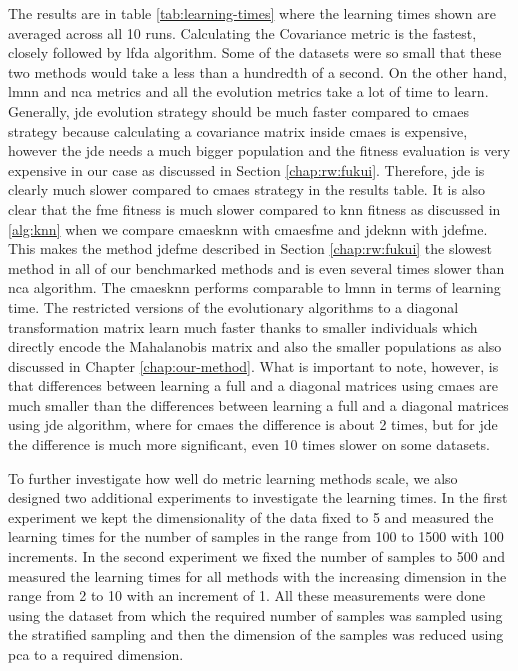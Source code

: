 \documentclass[12pt,a4paper]{report}
\begin{document}
The results are in table \ref{tab:learning-times} where the learning times shown are averaged across all 10 runs. Calculating the Covariance metric is the fastest, closely followed by \ac{lfda} algorithm. Some of the datasets were so small that these two methods would take a less than a hundredth of a second. On the other hand, \ac{lmnn} and \ac{nca} metrics and all the evolution metrics take a lot of time to learn. Generally, \ac{jde} evolution strategy should be much faster compared to \ac{cmaes} strategy because calculating a covariance matrix inside \ac{cmaes} is expensive, however the \ac{jde} needs a much bigger population and the fitness evaluation is very expensive in our case as discussed in Section \ref{chap:rw:fukui}. Therefore, \ac{jde} is clearly much slower compared to \ac{cmaes} strategy in the results table. It is also clear that the \ac{fme} fitness is much slower compared to \ac{knn} fitness as discussed in \ref{alg:knn} when we compare \ac{cmaesknn} with \ac{cmaesfme} and \ac{jdeknn} with \ac{jdefme}. This makes the method \ac{jdefme} described in Section \ref{chap:rw:fukui} the slowest method in all of our benchmarked methods and is even several times slower than \ac{nca} algorithm. The \ac{cmaesknn} performs comparable to \ac{lmnn} in terms of learning time. The restricted versions of the evolutionary algorithms to a diagonal transformation matrix learn much faster thanks to smaller individuals which directly encode the Mahalanobis matrix and also the smaller populations as also discussed in Chapter \ref{chap:our-method}. What is important to note, however, is that differences between learning a full and a diagonal matrices using \ac{cmaes} are much smaller than the differences between learning a full and a diagonal matrices using \ac{jde} algorithm, where for \ac{cmaes} the difference is about 2 times, but for \ac{jde} the difference is much more significant, even 10 times slower on some datasets.



To further investigate how well do metric learning methods scale, we also designed two additional experiments to investigate the learning times. In the first experiment we kept the dimensionality of the data fixed to 5 and measured the learning times for the number of samples in the range from 100 to 1500 with 100 increments. In the second experiment we fixed the number of samples to 500 and measured the learning times for all methods with the increasing dimension in the range from 2 to 10 with an increment of 1. All these measurements were done using the  dataset from which the required number of samples was sampled using the stratified sampling and then the dimension of the samples was reduced using \ac{pca} to a required dimension.
\end{document}
